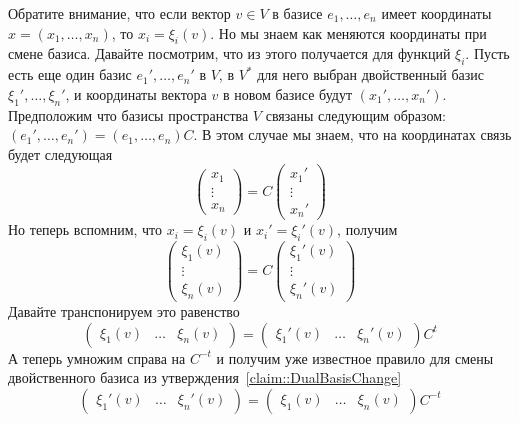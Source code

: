Обратите внимание, что если вектор $v\in V$ в базисе $e_1,\ldots, e_n$ имеет координаты $x = (x_1,\ldots, x_n)$, то $x_i = \xi_i(v)$.
Но мы знаем как меняются координаты при смене базиса.
Давайте посмотрим, что из этого получается для функций $\xi_i$.
Пусть есть еще один базис $e_1',\ldots, e_n'$ в $V$, в $V^*$ для него выбран двойственный базис $\xi_1',\ldots, \xi_n'$, и координаты вектора $v$ в новом базисе будут $(x_1',\ldots, x_n')$.
Предположим что базисы пространства $V$ связаны следующим образом: $(e_1',\ldots, e_n') = (e_1,\ldots, e_n) C$.
В этом случае мы знаем, что на координатах связь будет следующая
\[
\begin{pmatrix}
{x_1}\\{\vdots}\\{x_n}
\end{pmatrix}
=
C
\begin{pmatrix}
{x_1'}\\{\vdots}\\{x_n'}
\end{pmatrix}
\]
Но теперь вспомним, что $x_i = \xi_i(v)$ и $x_i' = \xi_i'(v)$, получим
\[
\begin{pmatrix}
{\xi_1(v)}\\{\vdots}\\{\xi_n(v)}
\end{pmatrix}
=
C
\begin{pmatrix}
{\xi_1'(v)}\\{\vdots}\\{\xi_n'(v)}
\end{pmatrix}
\]
Давайте транспонируем это равенство
\[
\begin{pmatrix}
{\xi_1(v)}&{\ldots}&{\xi_n(v)}
\end{pmatrix}
=
\begin{pmatrix}
{\xi_1'(v)}&{\ldots}&{\xi_n'(v)}
\end{pmatrix}
C^t
\]
А теперь умножим справа на $C^{-t}$ и получим уже известное правило для смены двойственного базиса из утверждения~\ref{claim::DualBasisChange}
\[
\begin{pmatrix}
{\xi_1'(v)}&{\ldots}&{\xi_n'(v)}
\end{pmatrix}
=
\begin{pmatrix}
{\xi_1(v)}&{\ldots}&{\xi_n(v)}
\end{pmatrix}
C^{-t}
\]
